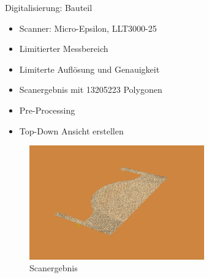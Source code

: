 \documentclass[../slides.tex]{subfiles}
\begin{document}
\begin{frame}{Digitalisierung: Bauteil}
    \begin{minipage}[t]{.39\textwidth}
      \begin{itemize}
        \item Scanner: Micro-Epsilon, LLT3000-25
        \item Limitierter Messbereich
        \item Limiterte Auflösung und Genauigkeit
        \item Scanergebnis mit 13205223 Polygonen
        \item Pre-Processing
        \item Top-Down Ansicht erstellen
      \end{itemize}
    \end{minipage}
    \hfill
    \begin{minipage}[t]{.6\textwidth}
      \begin{figure}[]
        \includegraphics[height=140pt]{img_niklas/base_scan.png}
        \caption{Scanergebnis}
        \label{fig:base_scan}
      \end{figure}
    \end{minipage}
  \end{frame}
\end{document}
